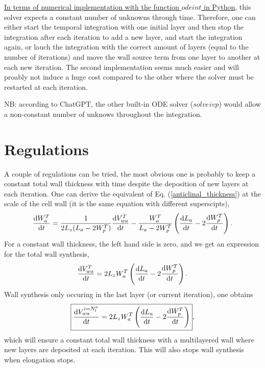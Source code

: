 \documentclass[]{article}
\begin{document}
\underline{In terms of numerical implementation with the function $odeint$ in Python}, this solver expects a  constant number of unknowns through time. Therefore, one can either start the temporal integration with one initial layer and then stop the integration after each iteration to add a new layer, and start the integration again, or lauch the integration with the correct amount of layers (equal to the number of iterations) and move the wall source term from one layer to another at each new iteration. The second implementation seems much easier and will proably not induce a huge cost compared to the other where the solver must be restarted at each iteration.

NB: according to ChatGPT, the other built-in ODE solver ($solve_{}ivp$) would allow a non-constant number of unknows throughout the integration.

\section{Regulations}
A couple of regulations can be tried, the most obvious one is probably to keep a constant total wall thickness with time despite the deposition of new layers at each iteration. One can derive the equivalent of Eq. (\ref{anticlinal_thickness}) at the scale of the cell wall (it is the same equation with different superscipts),
\begin{equation}
		\frac{{\rm d} W_{a}^T}{{\rm d} t}=\frac{1}{2L_z(L_a-2W_p^T)}\frac{{\rm d} V_{wa}^T}{{\rm d} t}  - \frac{W_a^T}{L_a-2W_p^T}\left(\frac{{\rm d} L_a}{{\rm d} t}-2\frac{{\rm d} W_p^T}{{\rm d} t}\right).
\end{equation}
For a constant wall thickness, the left hand side is zero, and we get an expression for the total wall synthesis,
\begin{equation}
		\frac{{\rm d} V_{wa}^T}{{\rm d} t} = 2L_zW_a^T\left(\frac{{\rm d} L_a}{{\rm d} t}-2\frac{{\rm d} W_p^T}{{\rm d} t}\right).
\end{equation}
Wall synthesis only occuring in the last layer (or current iteration), one obtains
\begin{equation}
	\boxed{
	\frac{{\rm d} V_{wa}^{i=N_l^a}}{{\rm d} t} = 2L_zW_a^T\left(\frac{{\rm d} L_a}{{\rm d} t}-2\frac{{\rm d} W_p^T}{{\rm d} t}\right)},
\end{equation}
which will ensure a constant total wall thickness with a multilayered wall where new layers are deposited at each iteration. This will also stops wall synthesis when elongation stops.
\end{document}
